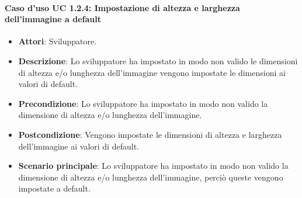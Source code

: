 \paragraph{Caso d'uso UC 1.2.4: Impostazione di altezza e larghezza dell'immagine a default}

\FloatBarrier
\begin{itemize}
\item\textbf{Attori}: Sviluppatore.
\item\textbf{Descrizione}: Lo sviluppatore ha impostato in modo non valido le dimensioni di altezza e/o lunghezza dell'immagine vengono impostate le dimensioni ai valori di default.
\item\textbf{Precondizione}: Lo sviluppatore ha impostato in modo non valido la dimensione di altezza e/o lunghezza dell'immagine.
\item\textbf{Postcondizione}: Vengono impostate le dimensioni di altezza e larghezza dell'immagine ai valori di default.
\item\textbf{Scenario principale}: Lo sviluppatore ha impostato in modo non valido la dimensione di altezza e/o lunghezza dell'immagine, perciò queste vengono impostate a default.
\end{itemize}


